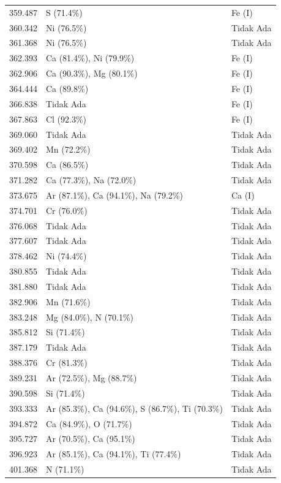 \begin{onehalfspace}
\begin{longtable}{p{} p{} p{}}
    359.487 & S (71.4\%) & Fe (I) \\
    360.342 & Ni (76.5\%) & Tidak Ada \\
    361.368 & Ni (76.5\%) & Tidak Ada \\
    362.393 & Ca (81.4\%), Ni (79.9\%) & Fe (I) \\
    362.906 & Ca (90.3\%), Mg (80.1\%) & Fe (I) \\
    364.444 & Ca (89.8\%) & Fe (I) \\
    366.838 & Tidak Ada & Fe (I) \\
    367.863 & Cl (92.3\%) & Fe (I) \\
    369.060 & Tidak Ada & Tidak Ada \\
    369.402 & Mn (72.2\%) & Tidak Ada \\
    370.598 & Ca (86.5\%) & Tidak Ada \\
    371.282 & Ca (77.3\%), Na (72.0\%) & Tidak Ada \\
    373.675 & Ar (87.1\%), Ca (94.1\%), Na (79.2\%) & Ca (I) \\
    374.701 & Cr (76.0\%) & Tidak Ada \\
    376.068 & Tidak Ada & Tidak Ada \\
    377.607 & Tidak Ada & Tidak Ada \\
    378.462 & Ni (74.4\%) & Tidak Ada \\
    380.855 & Tidak Ada & Tidak Ada \\
    381.880 & Tidak Ada & Tidak Ada \\
    382.906 & Mn (71.6\%) & Tidak Ada \\
    383.248 & Mg (84.0\%), N (70.1\%) & Tidak Ada \\
    385.812 & Si (71.4\%) & Tidak Ada \\
    387.179 & Tidak Ada & Tidak Ada \\
    388.376 & Cr (81.3\%) & Tidak Ada \\
    389.231 & Ar (72.5\%), Mg (88.7\%) & Tidak Ada \\
    390.598 & Si (71.4\%) & Tidak Ada \\
    393.333 & Ar (85.3\%), Ca (94.6\%), S (86.7\%), Ti (70.3\%) & Tidak Ada \\
    394.872 & Ca (84.9\%), O (71.7\%) & Tidak Ada \\
    395.727 & Ar (70.5\%), Ca (95.1\%) & Tidak Ada \\
    396.923 & Ar (85.1\%), Ca (94.1\%), Ti (77.4\%) & Tidak Ada \\
    401.368 & N (71.1\%) & Tidak Ada \\

\end{longtable}
\end{onehalfspace}
